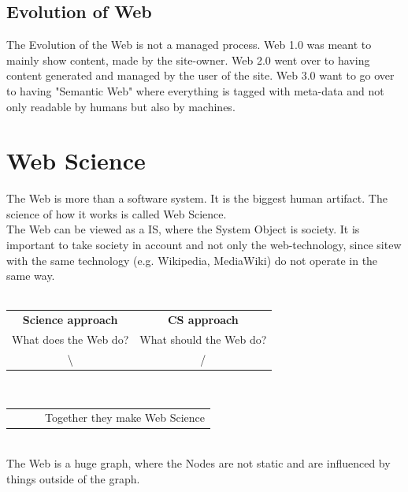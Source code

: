 \documentclass[a4paper]{article}
\begin{document}
	\subsection{Evolution of Web}
		The Evolution of the Web is not a managed process. Web 1.0 was meant to mainly
		show content, made by the site-owner. Web 2.0 went over to having content 
		generated and managed by the user of the site. Web 3.0 want to go over to 
		having "Semantic Web" where everything is tagged with meta-data and not 
		only readable by humans	but also by machines.
\section{Web Science}
	The Web is more than a software system. It is the biggest human artifact.
	The science of how it works is called Web Science.\\
	The Web can be viewed as a IS, where the System Object is society. It is important
	to take society in account and not only the web-technology, since sitew with the
	same technology (e.g. Wikipedia, MediaWiki) do not operate in the same way.\\\\
	\begin{tabular}{cc}
	\bf Science approach & \bf CS approach\\
	What does the Web do? & What should the Web do?\\
	\textbackslash & /\\
	\end{tabular}\\
	\begin{tabular}{cccc}
	&&&Together they make Web Science
	\end{tabular}\\
	The Web is a huge graph, where the Nodes are not static and are influenced by
	things outside of the graph.
\end{document}
